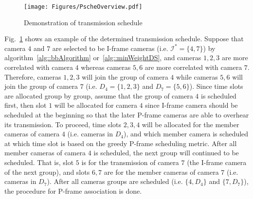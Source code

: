 \begin{figure}
\begin{center}
\texttt{[image: Figures/PscheOverview.pdf]}
\caption{\label{fig::pScheOverview}Demonstration of transmission schedule}
\end{center}
\end{figure}
%
Fig.~\ref{fig::pScheOverview} shows an example of the determined transmission schedule.
Suppose that camera $4$ and $7$ are selected to be I-frame cameras (i.e.  ${\mathcal{I}^*=\{4,7\}}$) by algorithm~\ref{alg::bbAlgorithm} or~\ref{alg::minWeightDS}, and cameras $1,2,3$ are more correlated with camera $4$ whereas cameras $5,6$ are more correlated with camera $7$.
Therefore, cameras $1,2,3$ will join the group of camera $4$ while cameras $5,6$ will join the group of camera $7$ (i.e. ${D_4=\{1,2,3\}}$ and ${D_7=\{5,6\}}$).
Since time slots are allocated group by group, assume that the group of camera $4$ is scheduled first, then slot $1$ will be allocated for camera $4$ since I-frame camera should be scheduled at the beginning so that the later P-frame cameras are able to overhear its transmission.
To proceed, time slots $2,3,4$ will be allocated for the member cameras of camera $4$ (i.e. cameras in $D_4$), and which member camera is scheduled at which time slot is based on the greedy P-frame scheduling metric.
After all member cameras of camera $4$ is scheduled, the next group will continued to be scheduled.
That is, slot $5$ is for the transmission of camera $7$ (the I-frame camera of the next group), and slots $6,7$ are for the member cameras of camera $7$ (i.e. cameras in $D_7$).
After all cameras groups are scheduled (i.e. ${\{4,D_4\}}$ and ${\{7,D_7\}}$), the procedure for P-frame association is done.